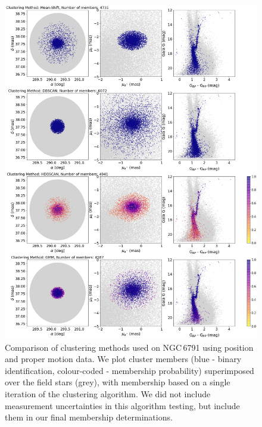 \begin{figure}[hbtp]
    \centering
    \includegraphics[width=0.92\linewidth]{Chapter4/6791_cluster_comp_pospm.png}
    \caption[Clustering method comparison - NGC\,6791 (I)]{Comparison of clustering methods used on NGC\,6791 using position and proper motion data. We plot cluster members (blue - binary identification, colour-coded - membership probability) superimposed over the field stars (grey), with membership based on a single iteration of the clustering algorithm. We did not include measurement uncertainties in this algorithm testing, but include them in our final membership determinations.}
    \label{fig:clustering_methods_comparison_nopara}
\end{figure}

